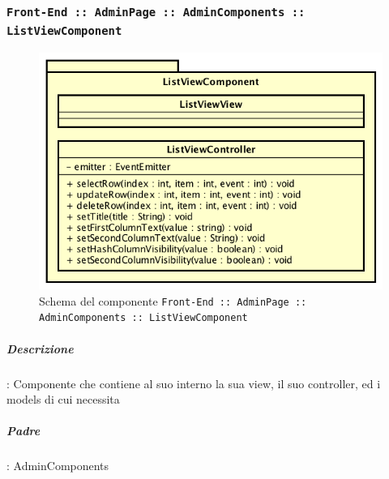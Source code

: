 \documentclass[../DefinizioneDiProdotto_v3.0.0.tex]{subfiles}
\begin{document}
	\subsubsection{\texttt{Front-End :: AdminPage :: AdminComponents :: ListViewComponent}}
	\begin{figure}[!h]
		\centering
		\includegraphics[scale=0.7]{Architettura/Front-End/AdminPage/AdminComponents/ListViewComponent.png}
		\caption{Schema del componente \texttt{Front-End :: AdminPage :: AdminComponents :: ListViewComponent}}
	\end{figure}

			\subparagraph{Descrizione}: Componente che contiene al suo interno la sua view, il suo controller, ed i models di cui necessita
			\subparagraph{Padre}: AdminComponents
\end{document}

